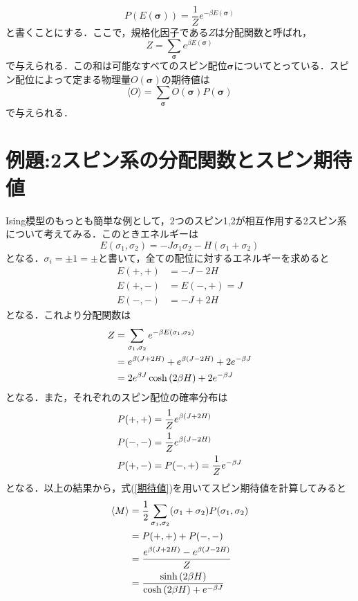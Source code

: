 \documentclass[a4paper,11pt]{jsarticle}
\begin{document}
\begin{equation}
  P(E(\bm{\sigma})) = \frac{1}{Z}e^{-\beta E(\bm{\sigma})}
\end{equation}
と書くことにする．ここで，規格化因子である$Z$は分配関数と呼ばれ，
\begin{equation}
  Z = \sum_{\bm{\sigma}} e^{\beta E(\bm{\sigma})}
\end{equation}
で与えられる．この和は可能なすべてのスピン配位$\bm{\sigma}$についてとっている．スピン配位によって定まる物理量$O(\bm{\sigma})$の期待値は
\begin{equation}
  \langle O \rangle = \sum_{\bm{\sigma}}O(\bm{\sigma}) P(\bm{\sigma}) \label{期待値}
\end{equation}
で与えられる．\par

\section*{例題:2スピン系の分配関数とスピン期待値}
Ising模型のもっとも簡単な例として，2つのスピン1,2が相互作用する2スピン系について考えてみる．このときエネルギーは
\begin{equation}
  E(\sigma_1, \sigma_2) = -J\sigma_1 \sigma_2 -H(\sigma_1 + \sigma_2)
\end{equation}
となる．$\sigma_i = \pm 1 = \pm$と書いて，全ての配位に対するエネルギーを求めると
\begin{align}
  E(+,+) & = -J -2H     \\
  E(+,-) & = E(-,+) = J \\
  E(-,-) & = -J +2H
\end{align}
となる．これより分配関数は
\begin{align}
  Z
   & = \sum_{\sigma_1,\sigma_2} e^{-\beta E(\sigma_1, \sigma_2)} \notag \\
   & = e^{\beta(J+2H)} + e^{\beta(J-2H)} + 2e^{-\beta J} \notag         \\
   & = 2e^{\beta J}\cosh{(2\beta H)} + 2e^{-\beta J} \label{eq:分配関数}
\end{align}
となる．また，それぞれのスピン配位の確率分布は
\begin{align}
  P(+,+) & = \frac{1}{Z} e^{\beta(J + 2H)} \notag \\
  P(-,-) & = \frac{1}{Z} e^{\beta(J - 2H)} \notag \\
  P(+,-) & = P(-,+) = \frac{1}{Z} e^{-\beta J}
\end{align}
となる．以上の結果から，式(\ref{期待値})を用いてスピン期待値を計算してみると
\begin{align}
  \langle M \rangle
   & = \frac{1}{2}\sum_{\sigma_1,\sigma_2}(\sigma_1 + \sigma_2)P(\sigma_1, \sigma_2) \notag \\
   & = P(+,+) + P(-,-) \notag                                                               \\
   & = \frac{e^{\beta(J + 2H)} - e^{\beta(J - 2H)}}{Z} \notag                               \\
   & = \frac{\sinh{(2\beta H)}}{\cosh{(2\beta H)} + e^{-\beta J}} \label{eq:スピン期待値}
\end{align}
\end{document}
